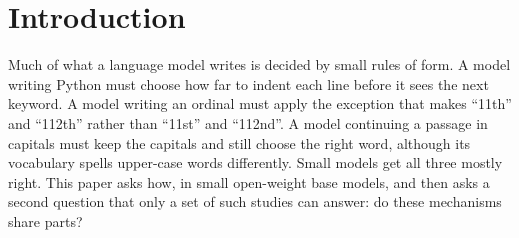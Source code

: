 \documentclass[11pt]{article}
\begin{document}
\begin{abstract}
\end{abstract}

\section{Introduction}
\label{sec:intro}

Much of what a language model writes is decided by small rules of form. A model writing Python must choose how far to indent each line before it sees the next keyword. A model writing an ordinal must apply the exception that makes ``11th'' and ``112th'' rather than ``11st'' and ``112nd''. A model continuing a passage in capitals must keep the capitals and still choose the right word, although its vocabulary spells upper-case words differently. Small models get all three mostly right. This paper asks how, in small open-weight base models, and then asks a second question that only a set of such studies can answer: do these mechanisms share parts?
\end{document}
